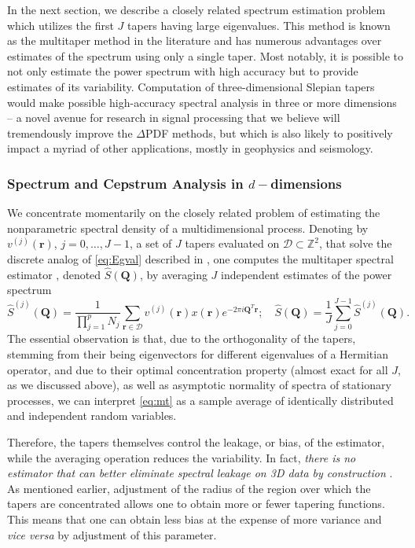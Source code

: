 In the next section, we describe a closely related spectrum estimation problem which
utilizes the first $J$ tapers having large eigenvalues. This method is known as the
multitaper method in the literature \cite{t82} and has numerous advantages over
estimates of the spectrum using only a single taper. Most notably, it is possible to
not only estimate the power spectrum with high accuracy but to provide estimates of
its variability. Computation of three-dimensional Slepian tapers would make possible
high-accuracy spectral analysis in three or more dimensions -- a novel avenue for
research in signal processing that we believe will tremendously improve the
$\Delta$PDF methods, but which is also likely to positively impact a myriad of other
applications, mostly in geophysics and seismology. 

\subsubsection{Spectrum and Cepstrum Analysis in $d-$dimensions \label{sec:MTSpectrum}}

We concentrate momentarily on the closely related problem of estimating the
nonparametric spectral density of a multidimensional process. Denoting by
$v^{(j)}(\mathbf{r})$, $j = 0,\ldots, J-1$, a set of $J$ tapers evaluated on
$\mathcal{D} \subset \mathbb{Z}^2$, that solve the discrete analog of
\eqref{eq:Egval} described in \cite{slepian1964}, one computes the multitaper
spectral estimator \cite{t82}, denoted $\hat{S}(\mathbf{Q}) $, by averaging $J$
independent estimates of the power spectrum \begin{equation} \label{eq:mt}
\hat{S}^{(j)}(\mathbf{Q}) = \frac{1}{\prod_{j=1}^p N_j} \sum_{\mathbf{r} \in
\mathcal{D}} v^{(j)}(\mathbf{r}) x(\mathbf{r}) e^{-2\pi i \mathbf{Q}^T \mathbf{r}};
\quad \hat{S}(\mathbf{Q}) = \frac{1}{J} \sum_{j=0}^{J-1} \hat{S}^{(j)}(\mathbf{Q}).
\end{equation} The essential observation is that, due to the orthogonality of the
tapers, stemming from their being eigenvectors for different eigenvalues of a
Hermitian operator, and due to their optimal concentration property (almost exact for
all $J$, as we discussed above), as well as asymptotic normality of spectra of
stationary processes, we can interpret \eqref{eq:mt} as a sample average of
identically distributed and independent random variables. 

Therefore, the tapers themselves control the leakage, or bias, of the estimator,
while the averaging operation reduces the variability. In fact, \textit{there is no
estimator that can better eliminate spectral leakage on 3D data by construction}
\cite{thomson2012}. As mentioned earlier, adjustment of the radius of the region over
which the tapers are concentrated allows one to obtain more or fewer tapering
functions. This means that one can obtain less bias at the expense of more variance
\cite{percival1993,bronez92} and \textit{vice versa} by adjustment of this parameter.

